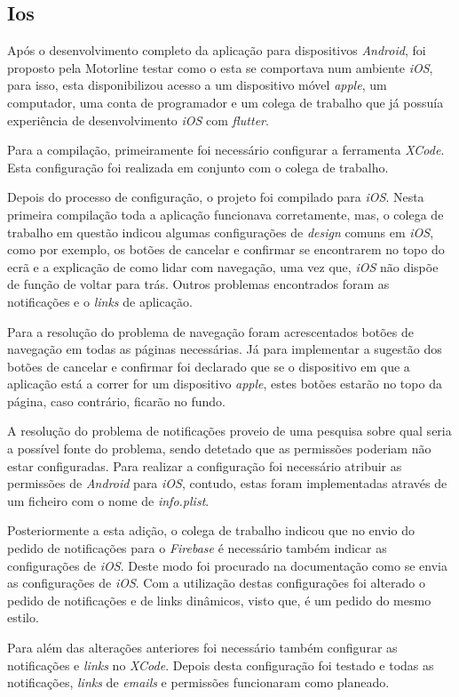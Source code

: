 \subsection{Ios}
Após o desenvolvimento completo da aplicação para dispositivos \textit{Android}, foi proposto pela Motorline testar como o esta se comportava num ambiente \textit{iOS}, para isso, esta disponibilizou acesso a um dispositivo móvel \textit{apple}, um computador, uma conta de programador e um colega de trabalho que já possuía experiência de desenvolvimento \textit{iOS} com \textit{flutter}.

Para a compilação, primeiramente foi necessário configurar a ferramenta \textit{XCode}. Esta configuração foi realizada em conjunto com o colega de trabalho.

Depois do processo de configuração, o projeto foi compilado para \textit{iOS}. Nesta primeira compilação toda a aplicação funcionava corretamente, mas, o colega de trabalho em questão indicou algumas configurações de \textit{design} comuns em \textit{iOS}, como por exemplo, os botões de cancelar e confirmar se encontrarem no topo do ecrã e a explicação de como lidar com navegação, uma vez que, \textit{iOS} não dispõe de função de voltar para trás. Outros problemas encontrados foram as notificações e o \textit{links} de aplicação.

Para a resolução do problema de navegação foram acrescentados botões de navegação em todas as páginas necessárias. Já para implementar a sugestão dos botões de cancelar e confirmar foi declarado que se o dispositivo em que a aplicação está a correr for um dispositivo \textit{apple}, estes botões estarão no topo da página, caso contrário, ficarão no fundo.

A resolução do problema de notificações proveio de uma pesquisa sobre qual seria a possível fonte do problema, sendo detetado que as permissões poderiam não estar configuradas. Para realizar a configuração foi necessário atribuir as permissões de \textit{Android} para \textit{iOS}, contudo, estas foram implementadas através de um ficheiro com o nome de \textit{info.plist}.

Posteriormente a esta adição, o colega de trabalho indicou que no envio do pedido de notificações para o \textit{Firebase} é necessário também indicar as configurações de \textit{iOS}. Deste modo foi procurado na documentação como se envia as configurações de \textit{iOS}. Com a utilização destas configurações foi alterado o pedido de notificações e de links dinâmicos, visto que, é um pedido do mesmo estilo.

Para além das alterações anteriores foi necessário também configurar  as notificações e \textit{links} no \textit{XCode}. Depois desta configuração foi testado e todas as notificações, \textit{links} de \textit{emails} e permissões funcionaram como planeado.